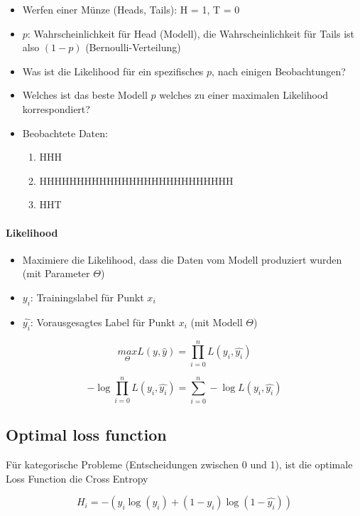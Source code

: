 \documentclass[a4paper]{article}
\begin{document}
		\begin{itemize}
			\item Werfen einer Münze (Heads, Tails): H = 1, T = 0
			\item $p$: Wahrscheinlichkeit für Head (Modell), die Wahrscheinlichkeit für Tails ist also $(1-p)$ (Bernoulli-Verteilung)
			\item Was ist die Likelihood für ein spezifisches $p$, nach einigen Beobachtungen?
			\item Welches ist das beste Modell $p$ welches zu einer maximalen Likelihood korrespondiert?
			\item Beobachtete Daten:
				\begin{enumerate}
					\item HHH
					\item HHHHHHHHHHHHHHHHHHHHHHHHHH
					\item HHT
				\end{enumerate}
		\end{itemize}
	
		\paragraph{Likelihood}
		
		\begin{itemize}
			\item Maximiere die Likelihood, dass die Daten vom Modell produziert wurden (mit Parameter $\Theta$)
			\item $y_{i}$: Trainingslabel für Punkt $x_{i}$
			\item $\hat{y_{i}}$: Vorausgesagtes Label für Punkt $x_{i}$ (mit Modell $\Theta$)
		\end{itemize}
	
		$$\underset{\Theta}{max}L( y, \hat{y} ) = \prod_{i=0}^{n} L(y_{i}, \hat{y_{i}})$$

		$$ -\log \prod_{i=0}^{n} L(y_{i}, \hat{y_{i}}) = \sum_{i=0}^{n} -\log L(y_{i}, \hat{y_{i}}) $$
		
		\newpage
		
		\subsection{Optimal loss function}
		
		Für kategorische Probleme (Entscheidungen zwischen 0 und 1), ist die optimale Loss Function die Cross Entropy
		
		$$  H_{i} = - ( y_{i} \log( \hat{y_{i}} ) + (1 - y_{i}) \log( 1-\hat{y_{i}} ) ) $$
		
\end{document}
